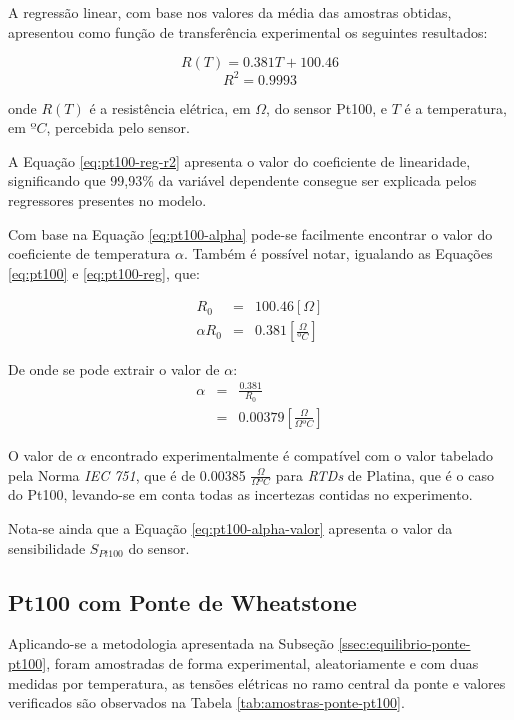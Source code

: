 \documentclass[a4paper]{instrumentacao}
\begin{document}
A regressão linear, com base nos valores da média das amostras obtidas, apresentou como função de transferência experimental os seguintes resultados:

\begin{equation}
	R(T) = 0.381T + 100.46
	\label{eq:pt100-reg}
\end{equation}
\begin{equation}
	R^2=0.9993
	\label{eq:pt100-reg-r2}
\end{equation}

\noindent
onde $R(T)$ é a resistência elétrica, em $\Omega$, do sensor Pt100, e $T$ é a temperatura, em $ºC$, percebida pelo sensor.

A Equação \ref{eq:pt100-reg-r2} apresenta o valor do coeficiente de linearidade, significando que 99,93\% da variável dependente consegue ser explicada pelos regressores presentes no modelo.

Com base na Equação \ref{eq:pt100-alpha} pode-se facilmente encontrar o valor do coeficiente de temperatura $\alpha$. Também é possível notar, igualando as Equações \ref{eq:pt100} e \ref{eq:pt100-reg}, que:

\begin{eqnarray}
	R_0 &=& 100.46 [\Omega]\\
	\alpha R_0 &=& 0.381 [\frac{\Omega}{ºC}] \label{eq:pt100-alpha-valor}
\end{eqnarray}

De onde se pode extrair o valor de $\alpha$:
\begin{eqnarray}
	\alpha &=& \frac{0.381}{R_0} \\
	       &=& 0.00379 [\frac{\Omega}{\Omega ºC}]
\end{eqnarray}

O valor de $\alpha$ encontrado experimentalmente é compatível com o valor tabelado pela Norma \textit{IEC 751}, que é de 0.00385 $\frac{\Omega}{\Omega ºC}$ para \textit{RTDs} de Platina, que é o caso do Pt100, levando-se em conta todas as incertezas contidas no experimento.

Nota-se ainda que a Equação \ref{eq:pt100-alpha-valor} apresenta o valor da sensibilidade $S_{Pt100}$ do sensor.

\subsection{Pt100 com Ponte de Wheatstone }
Aplicando-se a metodologia apresentada na Subseção \ref{ssec:equilibrio-ponte-pt100}, foram amostradas de forma experimental, aleatoriamente e com duas medidas por temperatura, as tensões elétricas no ramo central da ponte e valores verificados são observados na Tabela \ref{tab:amostras-ponte-pt100}.
\end{document}

